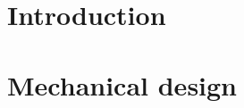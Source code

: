 \documentclass[a4paper,11pt]{article}
\begin{document}
\section{Introduction\label{sec:Introduction}}


\section{Mechanical design \label{sec:Mechanics}}






\newpage
\printbibliography 
\end{document}
